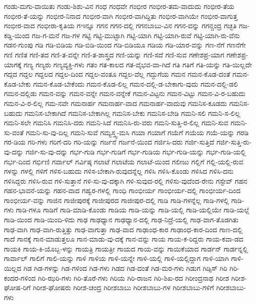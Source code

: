 {ಗಂಡು-ಮಗು-ವಾಯಿತು
ಗಂಡು-ಶಿಶು-ವಿನ
ಗಂಧ
ಗಂಧವೇ
ಗಂಭೀರ
ಗಂಭೀರ-ತಮ-ವಾದುದು
ಗಂಭೀರ-ತೆಯ
ಗಂಭೀರ-ತೆ-ಯನ್ನು
ಗಂಭೀರ-ನಿನಾದ
ಗಂಭೀರ-ವಾಗಿ
ಗಂಭೀರ-ವಾಗಿದ್ದಿತು
ಗಂಭೀರ-ವಾಗಿಯೇ
ಗಂಭೀರ-ವಾಗುತ್ತ
ಗಂಭೀರ-ವಾದ
ಗಂಭೀರಾ-ಕೃತಿಯ
ಗಇನ್ನೂ
ಗಗನ
ಗಗನ-ದಲ್ಲಿ
ಗಗನಬಾಬು-ವಿನ
ಗಗನ-ವನ್ನು
ಗಗನ್ಚಂದ್ರ
ಗಚ್ಛತಿ
ಗಜ-ಕಡ್ಡಿ-ಯಿಂದ
ಗಜ-ಗ-ಮನೆ
ಗಜ-ಗಳ
ಗಟ್ಟಿ
ಗಟ್ಟಿ-ಮುಟ್ಟಾಗಿ
ಗಟ್ಟಿ-ಯಾಗಿ
ಗಟ್ಟಿ-ಯಾಗಿ-ರುವೆ
ಗಟ್ಟಿ-ಯಾಗಿ-ರು-ವೆನು
ಗಡನ-ಗುಂಪು
ಗಡಿ
ಗಡಿ-ಬಿಡಿಯ
ಗಡಿ-ಬಿಡಿ-ಯಿಂದ
ಗಡಿ-ಬಿಡಿಯೂ
ಗಡಿಯ
ಗಡಿ-ಯಾರ-ವನ್ನು
ಗಣ-ನೆಗೆ
ಗಣನೆಗೇ
ಗಣಿ
ಗಣಿತ
ಗಣಿ-ತದ
ಗಣಿ-ತ-ವನ್ನೇ
ಗಣಿ-ತ-ಶಾಸ್ತ್ರದ
ಗಣಿ-ಯನ್ನು
ಗಣಿ-ಸದೆ
ಗಣಿ-ಸುವ
ಗಣೇಶಪ್ರ-ಯಾಗ
ಗಣೇಶಪ್ರ-ಯಾಗಕ್ಕೆ
ಗಣ್ಯ
ಗಣ್ಯರು
ಗಣ್ಯವ್ಯಕ್ತಿ-ಗಳು
ಗತಂ
ಗತ-ಕಾಲದ
ಗತ-ವೈಭವ-ವಾ-ಗಿದೆ
ಗತಿ
ಗತಿಗೆ
ಗತಿ-ಯನ್ನು
ಗತಿ-ಯಿಲ್ಲದೇ
ಗದ್ಗದ
ಗದ್ದಲ
ಗದ್ದಲದ
ಗದ್ದಲ-ದಿಂದ
ಗದ್ದಲ-ವಂತೂ
ಗದ್ದಲ-ವೆಲ್ಲ
ಗದ್ದುಗೆಯ
ಗಮನ
ಗಮನ-ಕೊಡ-ದಂತೆ
ಗಮನ-ಕೊಡ-ಬೇಕು
ಗಮನ-ಕೊಡ-ಬೇಕೆಂದು
ಗಮನ-ಕೊಡ-ಲಿಲ್ಲ
ಗಮನ-ದಲ್ಲಿ-ಡ-ಬೇಕಾಗು-ವುದು
ಗಮನ-ದಲ್ಲಿ-ಡಲಿ
ಗಮನ-ದಲ್ಲಿಡು
ಗಮನ-ವನ್ನು
ಗಮನ-ವನ್ನೇ
ಗಮನ-ವನ್ನೇಕೆ
ಗಮನ-ವಿಟ್ಟನು
ಗಮನ-ವಿಟ್ಟು
ಗಮನ-ವಿ-ರ-ಬಹುದು
ಗಮನ-ವಿ-ರ-ಲಿಲ್ಲ
ಗಮ-ನವೇ
ಗಮನಾರ್ಹ
ಗಮನಾರ್ಹ-ವಾದ
ಗಮನಾರ್ಹ-ವಾದುವು
ಗಮನಿಸ-ಕೂಡದು
ಗಮನಿಸ-ಬಹುದು
ಗಮನಿಸ-ಬೇಕಾಗಿದೆ
ಗಮನಿಸ-ಬೇಕಾಗಿಲ್ಲ
ಗಮನಿಸ-ಬೇಕು
ಗಮನಿಸ-ಬೇಡಿ
ಗಮನಿ-ಸಲಿ
ಗಮನಿ-ಸ-ಲಿಲ್ಲ
ಗಮನಿ-ಸಲೇ
ಗಮನಿಸಿ
ಗಮನಿಸಿ-ದರು
ಗಮನಿ-ಸಿದೆ
ಗಮನಿಸಿ-ರು-ವರು
ಗಮನಿ-ಸುತ್ತಿ-ರ-ಲಿಲ್ಲ
ಗಮನಿ-ಸುವ
ಗಮನಿ-ಸು-ವಂತೆ
ಗಮನಿ-ಸು-ವು-ದಿಲ್ಲ
ಗಮನಿ-ಸುವೆ
ಗಮ್ಯಸ್ತ್ವ-ಮಸಿ
ಗಯಾ
ಗಯಾಗೆ
ಗಯೆಗೆ
ಗಯೆಯ
ಗಯೆ-ಯನ್ನು
ಗರಡಿ
ಗರ-ಡಿಯ
ಗರಿ-ಗಳು
ಗರಿಗೆ-ದರಿ
ಗರಿ-ಯನ್ನು
ಗರ್ಜನೆ
ಗರ್ಜನೆ-ಯಿಂದ
ಗರ್ಜಿಸಿ-ದರು
ಗರ್ಜಿ-ಸುತ್ತಿದೆ
ಗರ್ಜಿ-ಸುತ್ತಿ-ರು-ವು-ದನ್ನು
ಗರ್ಜಿ-ಸು-ವು-ದನ್ನು
ಗರ್ಭ-ಗುಡಿ
ಗರ್ಭ-ಗುಡಿಗೆ
ಗರ್ಭ-ಗುಡಿಯ
ಗರ್ಭ-ಗುಡಿ-ಯನ್ನು
ಗರ್ಭ-ಗುಡಿ-ಯಲ್ಲಿ
ಗರ್ಭ-ದಿಂದ
ಗರ್ಭಿಣಿ
ಗರ್ವಾಲ್
ಗರ್ವಿಷ್ಠ
ಗಲಾಟೆ
ಗಲಾಟೆಯ
ಗಲಾಟೆ-ಯಿಂದ
ಗಲೀಜು
ಗಲ್ಲಿಗೆ
ಗಲ್ಲಿ-ಯಲ್ಲಿ-ರುವ
ಗಳನ್ನು
ಗಳಲ್ಲಿ
ಗಳಿಗೆ
ಗಳಿಸ-ಬಹುದು
ಗಳಿಸ-ಬೇಕಾಗಿ-ರುವುದನ್ನೆಲ್ಲ
ಗಳಿಸಿ
ಗಳಿಸಿ-ಕೊಂಡು
ಗಳಿಸಿದ
ಗಳಿಸಿ-ದನು
ಗಳಿಸಿದ್ದರು
ಗಳಿಸಿ-ರುವ
ಗಳಿ-ಸುತ್ತಾನೆ
ಗಳಿ-ಸು-ವು-ದಕ್ಕಾಗಿ
ಗಳಿ-ಸುವುದ-ರಲ್ಲಿ
ಗಳಿಸು-ವುದೆಂದ-ರೇನು
ಗಸ್ಟೇವ್
ಗಹನ
ಗಹನ-ಭಾವನೆ-ಯನ್ನು
ಗಹನ-ವಾದ
ಗಹ್ವರ-ಗಳಲ್ಲಿ
ಗಾಂಧಿ
ಗಾಂಭೀರ್ಯ
ಗಾಂಭೀರ್ಯ-ದಲ್ಲಿ
ಗಾಂಭೀರ್ಯ-ದಿಂದ
ಗಾಂಭೀರ್ಯ-ವನ್ನು
ಗಾಜಿನ
ಗಾಜೀಪುರಕ್ಕೆ
ಗಾಜೀಪುರದ
ಗಾಜೀಪುರ-ದಲ್ಲಿ
ಗಾಡಿ
ಗಾಡಿ-ಗಳನ್ನೆಲ್ಲ
ಗಾಡಿ-ಗಳಲ್ಲಿ
ಗಾಡಿ-ಗಳು
ಗಾಡಿ-ಗಳೂ
ಗಾಡಿಗೆ
ಗಾಡಿ-ಮಾಡಿ-ಕೊಂಡು
ಗಾಡಿಯ
ಗಾಡಿ-ಯನ್ನು
ಗಾಡಿ-ಯಲ್ಲಿ
ಗಾಡಿ-ಯಲ್ಲಿಯೇ
ಗಾಡಿ-ಯಲ್ಲೆ
ಗಾಡಿ-ಯಿಂದ
ಗಾಡಿ-ಯಿಂದಿ-ಳಿದು
ಗಾಢ
ಗಾಢಧ್ಯಾನ
ಗಾಢಧ್ಯಾನ-ದಲ್ಲಿ
ಗಾಢ-ನಿದ್ರೆ-ಯಲ್ಲಿ
ಗಾಢ-ವಾಗ-ತೊಡಗಿತು
ಗಾಢ-ವಾಗಿ
ಗಾಢ-ವಾಗಿ-ರುತ್ತಿತ್ತು
ಗಾಢ-ವಾಗುತ್ತಾ
ಗಾಢ-ವಾದ
ಗಾಢಾಂಧ-ಕಾರ
ಗಾಢಾಂಧ-ಕಾರ-ದಿಂದ
ಗಾಣ-ದಲ್ಲಿ
ಗಾದೆ
ಗಾನಕ್ಕೆ
ಗಾನ-ಮಾಡುತ್ತಲೂ
ಗಾನ-ಮಾಡು-ವು-ದಕ್ಕೆ
ಗಾನ-ವನ್ನು
ಗಾಯ
ಗಾಯ-ಕ-ರಿದ್ದರು
ಗಾಯ-ಕವಾ-ಡದ
ಗಾಯಕಿ
ಗಾಯ-ಕಿ-ಯೊಬ್ಬ-ಳನ್ನು
ಗಾಯತ್ರಿ
ಗಾಯತ್ರೀ
ಗಾಯದ
ಗಾಯ-ವನ್ನು
ಗಾಯಿಕೆಯಾದ
ಗಾರ್ಡನ್
ಗಾರ್ಡನ್ನಲ್ಲಿ
ಗಾರ್ವಾಲ್
ಗಾಲಿಗೆ
ಗಾಲಿ-ಯನ್ನು
ಗಾಳಿ
ಗಾಳಿಯ
ಗಾಳಿ-ಯನ್ನೇ
ಗಾಳಿ-ಯಲ್ಲಿ
ಗಾಳಿ-ಯಲ್ಲಿದ್ದಾಗ
ಗಾಳಿ-ಯಾಗಿ
ಗಾಳಿ-ಯಿಲ್ಲದ
ಗಿಡ
ಗಿಡ-ಗಳನ್ನು
ಗಿಡ-ಗಳಿಂದ
ಗಿಡ-ಗಳು
ಗಿಡದ
ಗಿಡ-ದಂತೆ
ಗಿಡ-ಮರ-ಗಳು
ಗಿಡುಗ
ಗಿಡ್ಸಿಸ್
ಗಿರಿ
ಗಿರಿ-ಕಂದರ-ಗಳಿಂದ
ಗಿರಿ-ಝರಿ-ಗಳು
ಗಿರಿ-ತೊರೆ-ಗಳು
ಗಿರಿಯ
ಗಿರಿ-ರಾಜನ
ಗಿರಿ-ಶಿಖ-ರದ
ಗಿರೀಂದ್ರನಾಥ
ಗಿರೀಶ
ಗಿರೀಶ-ಘೋಷ-ರಿಗೆ
ಗಿರೀಶ-ಘೋಷರು
ಗಿರೀಶ-ಚಂದ್ರ
ಗಿರೀಶಬಾಬು
ಗಿರೀಶಬಾಬು-ಗಳ
ಗಿರೀಶಬಾಬು-ಗಳಿಗೆ
ಗಿರೀಶಬಾಬು-ಗಳು
}
